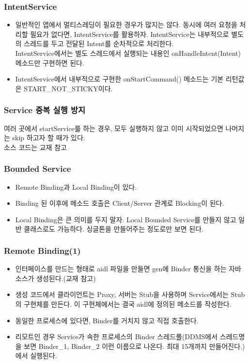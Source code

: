 \documentclass{beamer}
\begin{document}
\begin{frame}
\frametitle{IntentService}
\begin{itemize}
\item 일반적인 앱에서 멀티스레딩이 필요한 경우가 많지는 않다. 동시에 여러 요청을 처리할 필요가 없다면, IntentService를 활용하자.
IntentService는 내부적으로 별도의 스레드를 두고 전달된 Intent를 순차적으로 처리한다.\\
IntentService에서는 별도 스레드에서 실행되는 내용인 onHandleIntent(Intent) 메소드만 구현하면 된다.
\item IntentService에서 내부적으로 구현한 onStartCommand() 메소드는 기본 리턴값은 START\_NOT\_STICKY이다.
\end{itemize}
\end{frame}

\begin{frame}[fragile]
\frametitle{Service 중복 실행 방지}
여러 곳에서 startService를 하는 경우, 모두 실행하지 않고 이미 시작되었으면 나머지는 skip 하고자 할 때가 있다.\\
소스 코드는 교재 참고
\end{frame}

\begin{frame}
\frametitle{Bounded Service}
\begin{itemize}
\item Remote Binding과 Local Binding이 있다.
\item Binding 된 이후에 메소드 호출은 Client/Server 관계로 Blocking이 된다.
\item Local Binding은 큰 의미를 두지 말자. Local Bounded Service를 만들지 않고 일반 클래스로도 가능하다. 싱글톤을 만들어주는 정도로만 보면 된다.
\end{itemize}
\end{frame}

\begin{frame}
\frametitle{Remote Binding(1)}
\begin{itemize}
\item 인터페이스를 만드는 형태로 aidl 파일을 만들면 gen에 Binder 통신을 하는  자바 소스가 생성된다.(교재 참고)
\item 생성 코드에서 클라이언트는 Proxy, 서버는 Stub을 사용하며 Service에서는 Stub의  구현체를 만든다. 이 구현체에서는 결국 aidl에 정의된 메소드를 작성한다.
\item 동일한 프로세스에 있다면, Binder를 거치지 않고 직접 호출한다.
\item 리모트인 경우 Service가 속한 프로세스의 Binder 스레드풀(DDMS에서 스레드명을 보면 Binder\_1, Binder\_2 이런 이름으로 나온다. 최대 15개까지 만들어진다.)에서 실행된다.
\end{itemize}
\end{frame}
\end{document}
